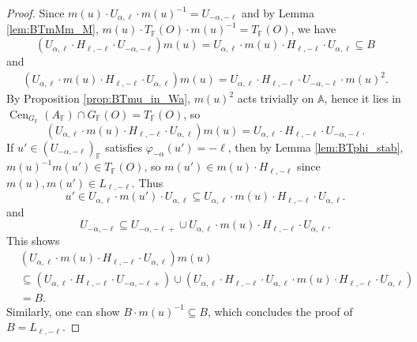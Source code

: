 \documentclass[12pt]{amsart}
\newcommand{\F}{\mathbb{F} }
\newcommand{\A}{\mathbb{A}}
\numberwithin{equation}{section}
\theoremstyle{remark} %
\begin{document}
\begin{proof}
			Since $m(u)\cdot U_{\alpha,\ell}\cdot m(u)^{-1} = U_{-\alpha,-\ell}$ and by Lemma \ref{lem:BTmMm_M}, $m(u)\cdot T_\F(O) \cdot m(u)^{-1} = T_\F(O)$, we have
			$$
			(U_{\alpha,\ell} \cdot H_{\ell,-\ell}\cdot U_{-\alpha,-\ell})m(u) = U_{\alpha, \ell} \cdot m(u) \cdot  H_{\ell, -\ell} \cdot U_{\alpha,\ell} \subseteq B
			$$
			and 
			\begin{align*}
				\left( U_{\alpha,\ell}\cdot m(u) \cdot H_{\ell,-\ell} \cdot U_{\alpha,\ell} \right)  m(u)
				= U_{\alpha, \ell} \cdot  H_{\ell, -\ell} \cdot U_{-\alpha,-\ell}\cdot m(u)^2.
			\end{align*}
			By Proposition \ref{prop:BTmu_in_Wa}, $m(u)^{2}$ acts trivially on $\A$, %
			hence it lies in $ \operatorname{Cen}_{G_\F}(A_\F) \cap G_\F(O) = T_\F(O)$, so
			$$
			\left( U_{\alpha,\ell}\cdot m(u) \cdot H_{\ell,-\ell} \cdot U_{\alpha,\ell} \right)  m(u)
			= U_{\alpha, \ell} \cdot  H_{\ell, -\ell} \cdot U_{-\alpha,-\ell}.
			$$
			If $u'\in (U_{-\alpha,-\ell})_\F$ satisfies $\varphi_{-\alpha}(u') = -\ell$, then by Lemma \ref{lem:BTphi_stab}, $m(u)^{-1}m(u') \in T_\F(O) %
			$, so $m(u') \in m(u)\cdot H_{\ell,-\ell}$ since $m(u), m(u') \in L_{\ell,-\ell}$. Thus
			$$
			u' \in U_{\alpha,\ell}\cdot m(u')\cdot U_{\alpha, \ell} \subseteq U_{\alpha,\ell}\cdot  m(u) \cdot H_{\ell,-\ell} \cdot U_{\alpha,\ell}.
			$$
			and
			$$
			U_{-\alpha, -\ell} \subseteq U_{-\alpha,-\ell+} \cup U_{\alpha,\ell}\cdot m(u) \cdot H_{\ell,-\ell} \cdot U_{\alpha,\ell}.
			$$
			This shows 
			\begin{align*}
				&\left( U_{\alpha,\ell}\cdot m(u) \cdot H_{\ell,-\ell} \cdot U_{\alpha,\ell} \right)  m(u)\\
				&\subseteq \left( U_{\alpha, \ell} \cdot  H_{\ell, -\ell} \cdot U_{-\alpha,-\ell + } \right) \cup \left(U_{\alpha, \ell} \cdot  H_{\ell, -\ell} \cdot U_{\alpha,\ell } \cdot m(u)\cdot H_{\ell ,-\ell} \cdot U_{\alpha,\ell}\right) \\
				&= B.
			\end{align*}
			Similarly, one can show $B\cdot m(u)^{-1} \subseteq B$, which concludes the proof of $B= L_{\ell,-\ell}$.
		\end{proof}
		
\end{document}

